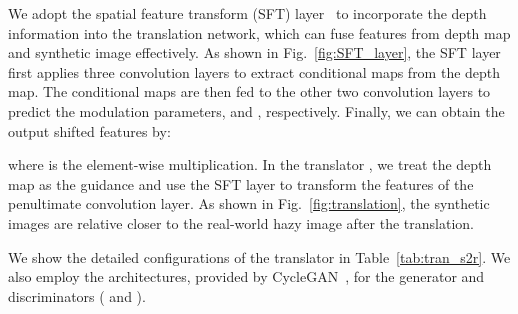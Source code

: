 \documentclass[10pt,twocolumn,letterpaper]{article}
\begin{document}
We adopt the spatial feature transform (SFT) layer~\cite{wang2018recovering, li2020dyna} to incorporate the depth information into the translation network, which can fuse features from depth map and synthetic image effectively. 
As shown in Fig.~\ref{fig:SFT_layer}, the SFT layer first applies three convolution layers to extract conditional maps  from the depth map.
The conditional maps are then fed to the other two convolution layers to predict the modulation parameters,  and , respectively.
Finally, we can obtain the output shifted features by:

where  is the element-wise multiplication.
In the translator , we treat the depth map as the guidance and use the SFT layer to transform the features of the penultimate convolution layer.
As shown in Fig.~\ref{fig:translation}, the synthetic images are relative closer to the real-world hazy image after the translation.


We show the detailed configurations of the translator  in Table~\ref{tab:tran_s2r}.
We also employ the architectures, provided by CycleGAN~\cite{zhu2017unpaired}, for the generator  and discriminators ( and ).
\end{document}

